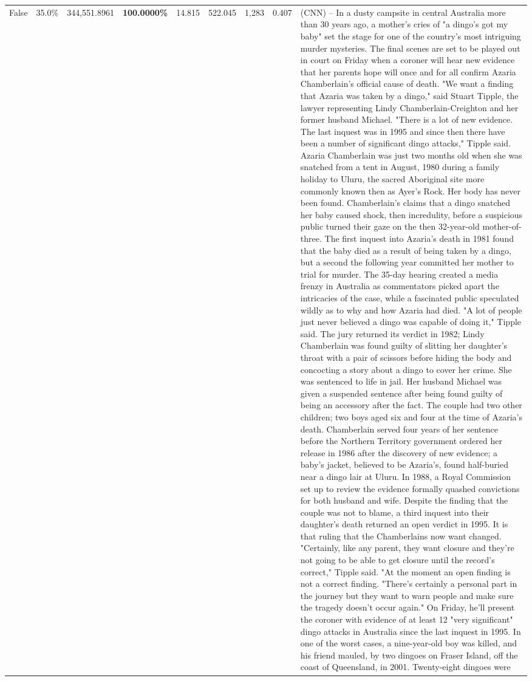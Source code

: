\begin{table}[H]
\begin{tabular}{lllrlllll}
False & 35.0\% & 344,551.8961 & \bfseries \color{red} 100.0000\% & 14.815 & 522.045 & 1,283 & 0.407 & (CNN) -- In a dusty campsite in central Australia more than 30 years ago, a mother's cries of "a dingo's got my baby" set the stage for one of the country's most intriguing murder mysteries. The final scenes are set to be played out in court on Friday when a coroner will hear new evidence that her parents hope will once and for all confirm Azaria Chamberlain's official cause of death. "We want a finding that Azaria was taken by a dingo," said Stuart Tipple, the lawyer representing Lindy Chamberlain-Creighton and her former husband Michael. "There is a lot of new evidence. The last inquest was in 1995 and since then there have been a number of significant dingo attacks," Tipple said. Azaria Chamberlain was just two months old when she was snatched from a tent in August, 1980 during a family holiday to Uluru, the sacred Aboriginal site more commonly known then as Ayer's Rock. Her body has never been found. Chamberlain's claims that a dingo snatched her baby caused shock, then incredulity, before a suspicious public turned their gaze on the then 32-year-old mother-of-three. The first inquest into Azaria's death in 1981 found that the baby died as a result of being taken by a dingo, but a second the following year committed her mother to trial for murder. The 35-day hearing created a media frenzy in Australia as commentators picked apart the intricacies of the case, while a fascinated public speculated wildly as to why and how Azaria had died. "A lot of people just never believed a dingo was capable of doing it," Tipple said. The jury returned its verdict in 1982; Lindy Chamberlain was found guilty of slitting her daughter's throat with a pair of scissors before hiding the body and concocting a story about a dingo to cover her crime. She was sentenced to life in jail. Her husband Michael was given a suspended sentence after being found guilty of being an accessory after the fact. The couple had two other children; two boys aged six and four at the time of Azaria's death. Chamberlain served four years of her sentence before the Northern Territory government ordered her release in 1986 after the discovery of new evidence; a baby's jacket, believed to be Azaria's, found half-buried near a dingo lair at Uluru. In 1988, a Royal Commission set up to review the evidence formally quashed convictions for both husband and wife. Despite the finding that the couple was not to blame, a third inquest into their daughter's death returned an open verdict in 1995. It is that ruling that the Chamberlains now want changed. "Certainly, like any parent, they want closure and they're not going to be able to get closure until the record's correct," Tipple said. "At the moment an open finding is not a correct finding. "There's certainly a personal part in the journey but they want to warn people and make sure the tragedy doesn't occur again." On Friday, he'll present the coroner with evidence of at least 12 "very significant" dingo attacks in Australia since the last inquest in 1995. In one of the worst cases, a nine-year-old boy was killed, and his friend mauled, by two dingoes on Fraser Island, off the coast of Queensland, in 2001. Twenty-eight dingoes were 
\end{tabular}
\end{table}
